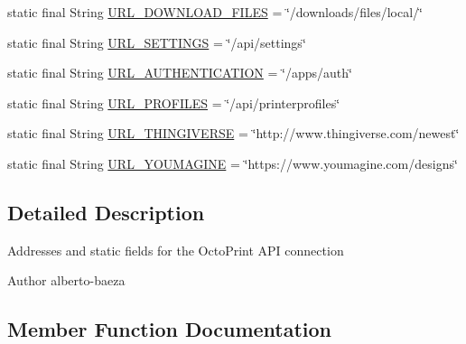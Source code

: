 \begin{DoxyCompactItemize}
\item 
static final String \hyperlink{classandroid_1_1app_1_1printerapp_1_1octoprint_1_1_http_utils_a1425abeced3be709c64db7424ac9d97b}{U\+R\+L\+\_\+\+D\+O\+W\+N\+L\+O\+A\+D\+\_\+\+F\+I\+L\+ES} = \char`\"{}/downloads/files/local/\char`\"{}
\item 
static final String \hyperlink{classandroid_1_1app_1_1printerapp_1_1octoprint_1_1_http_utils_ad4c0e06247673b4c9b1134d2b642d3a2}{U\+R\+L\+\_\+\+S\+E\+T\+T\+I\+N\+GS} = \char`\"{}/api/settings\char`\"{}
\item 
static final String \hyperlink{classandroid_1_1app_1_1printerapp_1_1octoprint_1_1_http_utils_abeaa2588e6bb8f3d6ab0cafa81fb63c5}{U\+R\+L\+\_\+\+A\+U\+T\+H\+E\+N\+T\+I\+C\+A\+T\+I\+ON} = \char`\"{}/apps/auth\char`\"{}
\item 
static final String \hyperlink{classandroid_1_1app_1_1printerapp_1_1octoprint_1_1_http_utils_a5074d33cc6ae364bc370ac74907bca38}{U\+R\+L\+\_\+\+P\+R\+O\+F\+I\+L\+ES} = \char`\"{}/api/printerprofiles\char`\"{}
\item 
static final String \hyperlink{classandroid_1_1app_1_1printerapp_1_1octoprint_1_1_http_utils_a6f377acff85e6dac567261bd23ae4535}{U\+R\+L\+\_\+\+T\+H\+I\+N\+G\+I\+V\+E\+R\+SE} = \char`\"{}http\+://www.\+thingiverse.\+com/newest\char`\"{}
\item 
static final String \hyperlink{classandroid_1_1app_1_1printerapp_1_1octoprint_1_1_http_utils_a66e2a46696e776c35000c73b37932df4}{U\+R\+L\+\_\+\+Y\+O\+U\+M\+A\+G\+I\+NE} = \char`\"{}https\+://www.\+youmagine.\+com/designs\char`\"{}
\end{DoxyCompactItemize}


\subsection{Detailed Description}
Addresses and static fields for the Octo\+Print A\+PI connection

\begin{DoxyAuthor}{Author}
alberto-\/baeza 
\end{DoxyAuthor}


\subsection{Member Function Documentation}
\mbox{\label{classandroid_1_1app_1_1printerapp_1_1octoprint_1_1_http_utils_ad9756103b6435d2422de884247179bbd}} 
